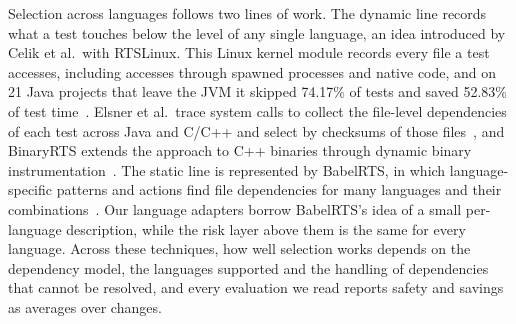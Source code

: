 \documentclass[11pt]{article}
\begin{document}
Selection across languages follows two lines of work. The dynamic line records what a test touches below the level of any single language, an idea introduced by Celik et al.\ with RTSLinux. This Linux kernel module records every file a test accesses, including accesses through spawned processes and native code, and on 21 Java projects that leave the JVM it skipped 74.17\% of tests and saved 52.83\% of test time~\cite{celik2017jvm}. Elsner et al.\ trace system calls to collect the file-level dependencies of each test across Java and C/C++ and select by checksums of those files~\cite{elsner2022multilang}, and BinaryRTS extends the approach to C++ binaries through dynamic binary instrumentation~\cite{elsner2023binaryrts}. The static line is represented by BabelRTS, in which language-specific patterns and actions find file dependencies for many languages and their combinations~\cite{maurina2025babelrts}. Our language adapters borrow BabelRTS's idea of a small per-language description, while the risk layer above them is the same for every language. Across these techniques, how well selection works depends on the dependency model, the languages supported and the handling of dependencies that cannot be resolved, and every evaluation we read reports safety and savings as averages over changes.
\end{document}
